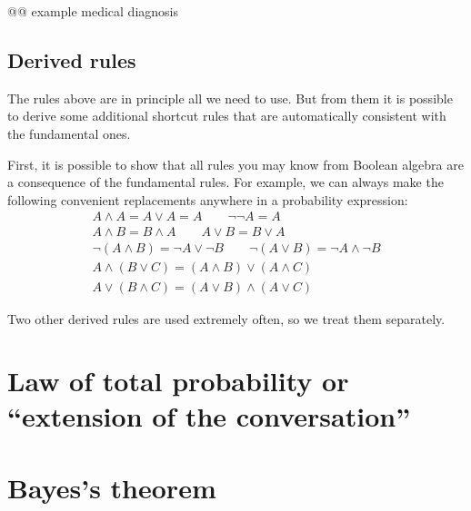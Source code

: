 \documentclass[
  a4paper,
  DIV=11,
  numbers=noendperiod,
  oneside]{scrreprt}
\begin{document}
@@ example medical diagnosis

\hypertarget{derived-rules}{%
\subsection{Derived rules}\label{derived-rules}}

The rules above are in principle all we need to use. But from them it is
possible to derive some additional shortcut rules that are automatically
consistent with the fundamental ones.

First, it is possible to show that all rules you may know from Boolean
algebra are a consequence of the fundamental rules. For example, we can
always make the following convenient replacements anywhere in a
probability expression: \[
\begin{gathered}
A \land A = A \lor A = A
\qquad
\lnot\lnot A = A
\\[1ex]
A\land B = B \land A
\qquad
A \lor B = B \lor A
\\[1ex]
\lnot (A \land B) = \lnot A \lor \lnot B
\qquad
\lnot (A \lor B) = \lnot A \land \lnot B
\\[1ex]
A \land (B \lor C) = (A \land B) \lor (A \land C)
\\[1ex]
A \lor (B \land C) = (A \lor B) \land (A \lor C)
\end{gathered}
\]

Two other derived rules are used extremely often, so we treat them
separately.

\hypertarget{law-of-total-probability-or-extension-of-the-conversation}{%
\section{Law of total probability or ``extension of the
conversation''}\label{law-of-total-probability-or-extension-of-the-conversation}}

\hypertarget{bayess-theorem}{%
\section{Bayes's theorem}\label{bayess-theorem}}
\end{document}
